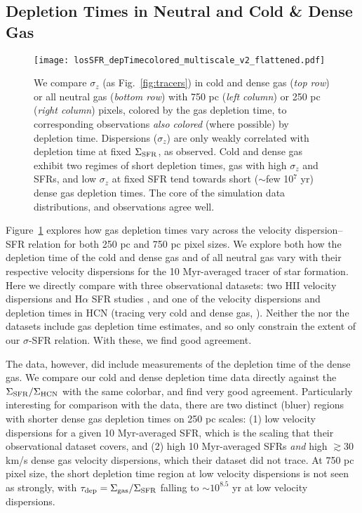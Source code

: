\documentclass[usletter,fleqn,usenatbib]{mnras}
\begin{document}
\subsection{Depletion Times in Neutral and Cold \& Dense Gas}
\begin{figure*}
	\centering
	\texttt{[image: losSFR\_depTimecolored\_multiscale\_v2\_flattened.pdf]}
	\caption{We compare $\sigma_z$ (as Fig.~\ref{fig:tracers}) in cold and dense gas (\emph{top row}) or all neutral gas (\emph{bottom row}) with 750 pc (\emph{left column}) or 250 pc (\emph{right column}) pixels, colored by the gas depletion time, to corresponding observations \emph{also colored} (where possible) by depletion time. Dispersions ($\sigma_z$) are only weakly correlated with depletion time at fixed $\Sigma_{\rm SFR}$, as observed. Cold and dense gas exhibit two regimes of short depletion times, gas with high $\sigma_z$ and SFRs, and low $\sigma_z$ at fixed SFR tend towards short ($\sim$few 10$^7$ yr) dense gas depletion times.   The core of the simulation data distributions, and observations agree well.}
\label{fig:Tdep}
\end{figure*}
Figure~\ref{fig:Tdep} explores how gas depletion times vary across the velocity dispersion--SFR relation for both 250 pc and 750 pc pixel sizes.  We explore both how the depletion time of the cold and dense gas and of all neutral gas vary with their respective velocity dispersions for the 10 Myr-averaged tracer of star formation.  Here we directly compare with three observational datasets: two H{\scriptsize II} velocity dispersions and H$\alpha$ SFR studies \citep{Rozas2006, Zhou2017}, and one of the velocity dispersions and depletion times in HCN (tracing very cold and dense gas, \citealt{Querejeta2019}).  Neither the \citet{Rozas2006} nor the \citet{Zhou2017} datasets include gas depletion time estimates, and so only constrain the extent of our $\sigma$-SFR relation.  With these, we find good agreement.  

The \citet{Querejeta2019} data, however, did include measurements of the depletion time of the dense gas.  We compare our cold and dense depletion time data directly against the $\Sigma_{\rm SFR}/\Sigma_{\rm HCN}$ with the same colorbar, and find very good agreement. Particularly interesting for comparison with the \citet{Querejeta2019} data, there are two distinct (bluer) regions with shorter dense gas depletion times on 250 pc scales: (1) low velocity dispersions for a given 10 Myr-averaged SFR, which is the scaling that their observational dataset covers, and (2) high 10 Myr-averaged SFRs \emph{and} high $\gtrsim 30$ km/s dense gas velocity dispersions, which their dataset did not trace.  At 750 pc pixel size, the short depletion time region at low velocity dispersions is not seen as strongly, with $\tau_{\rm dep} = \Sigma_{\rm gas}/\Sigma_{\rm SFR}$ falling to $\sim 10^{8.5}$ yr at low velocity dispersions.
\end{document}
